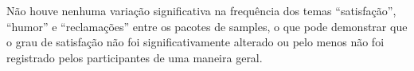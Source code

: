 
Não houve nenhuma variação significativa na frequência dos temas ``satisfação'', ``humor'' e ``reclamações'' entre os pacotes de samples, o que pode demonstrar que o grau de satisfação não foi significativamente alterado ou pelo menos não foi registrado pelos participantes de uma maneira geral. 







